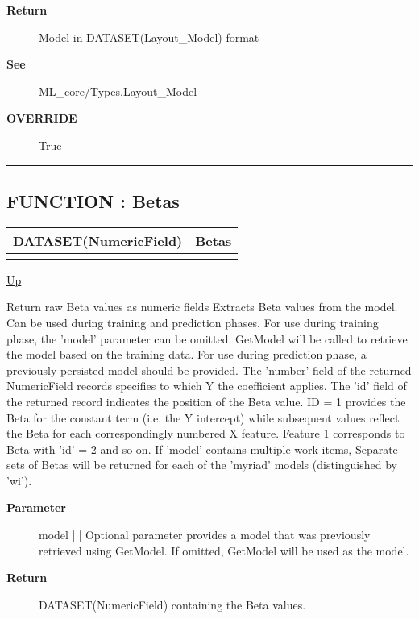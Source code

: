 \par
\begin{description}
\item [\textbf{Return}] Model in DATASET(Layout\_Model) format
\item [\textbf{See}] ML\_core/Types.Layout\_Model
\item [\textbf{OVERRIDE}] True
\end{description}

\rule{\textwidth}{0.4pt}
\subsection*{FUNCTION : Betas}
\hypertarget{ecldoc:linearregression.ols.betas}{}

{\renewcommand{\arraystretch}{1.5}
\begin{tabularx}{\textwidth}{|>{\raggedright\arraybackslash}l|X|}
\hline
\hspace{0pt}DATASET(NumericField) & Betas \\
\hline
\multicolumn{2}{|>{\raggedright\arraybackslash}X|}{\hspace{0pt}(DATASET(Layout\_Model) model=GetModel)} \\
\hline
\end{tabularx}
}

\hyperlink{ecldoc:linearregression.ols}{Up}

\par
Return raw Beta values as numeric fields Extracts Beta values from the model. Can be used during training and prediction phases. For use during training phase, the 'model' parameter can be omitted. GetModel will be called to retrieve the model based on the training data. For use during prediction phase, a previously persisted model should be provided. The 'number' field of the returned NumericField records specifies to which Y the coefficient applies. The 'id' field of the returned record indicates the position of the Beta value. ID = 1 provides the Beta for the constant term (i.e. the Y intercept) while subsequent values reflect the Beta for each correspondingly numbered X feature. Feature 1 corresponds to Beta with 'id' = 2 and so on. If 'model' contains multiple work-items, Separate sets of Betas will be returned for each of the 'myriad' models (distinguished by 'wi').

\par
\begin{description}
\item [\textbf{Parameter}] model ||| Optional parameter provides a model that was previously retrieved using GetModel. If omitted, GetModel will be used as the model.
\item [\textbf{Return}] DATASET(NumericField) containing the Beta values.
\end{description}

